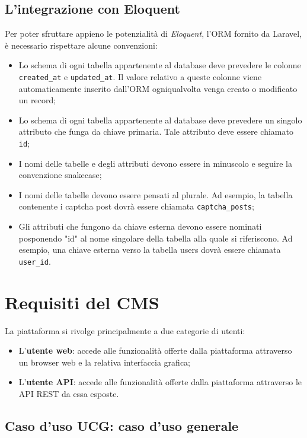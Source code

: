 \subsection{L'integrazione con Eloquent}
Per poter sfruttare appieno le potenzialità di \textit{Eloquent}, l'ORM fornito da Laravel, è necessario rispettare alcune convenzioni:
\begin{itemize}
	\item Lo schema di ogni tabella appartenente al database deve prevedere le colonne \verb!created_at! e \verb!updated_at!. Il valore relativo a queste colonne viene automaticamente inserito dall'ORM ogniqualvolta venga creato o modificato un record;
	\item Lo schema di ogni tabella appartenente al database deve prevedere un singolo attributo che funga da chiave primaria. Tale attributo deve essere chiamato \verb!id!;
	\item I nomi delle tabelle e degli attributi devono essere in minuscolo e seguire la convenzione \gls{snakecase}\glsfirstoccur{};
	\item I nomi delle tabelle devono essere pensati al plurale. Ad esempio, la tabella contenente i captcha post dovrà essere chiamata \verb!captcha_posts!;
		\item Gli attributi che fungono da chiave esterna devono essere nominati posponendo "id" al nome singolare della tabella alla quale si riferiscono. Ad esempio, una chiave esterna verso la tabella users dovrà essere chiamata \verb!user_id!.
\end{itemize}

\section{Requisiti del CMS}
La piattaforma si rivolge principalmente a due categorie di utenti:
\begin{itemize}
	\item L'\textbf{utente web}: accede alle funzionalità offerte dalla piattaforma attraverso un browser web e la relativa interfaccia grafica;
	\item L'\textbf{utente API}: accede alle funzionalità offerte dalla piattaforma attraverso le API REST da essa esposte. 
\end{itemize}

\hypertarget{UCG}{}
\subsection{Caso d'uso UCG: caso d'uso generale}

